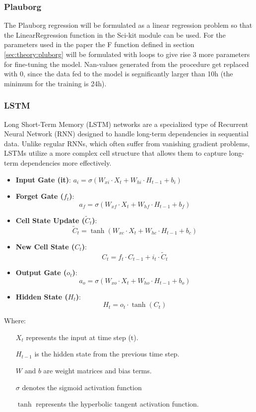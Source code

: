 \subsubsection{Plauborg}

The Plauborg regression will be formulated as a linear regression problem so that the LinearRegression function in the Sci-kit module can be used. For the parameters used in the paper\cite{plauborg_simple_2002} the F function defined in section \ref{sec:theory:pluborg} will be formulated with loops to give rise 3 more parameters for fine-tuning the model. Nan-values generated from the procedure get replaced with 0, since the data fed to the model is segnificantly larger than 10h (the minimum for the training is 24h).

\subsubsection{LSTM}

Long Short-Term Memory (LSTM) networks are a specialized type of Recurrent Neural Network (RNN) designed to handle long-term dependencies in sequential data. Unlike regular RNNs, which often suffer from vanishing gradient problems, LSTMs utilize a more complex cell structure that allows them to capture long-term dependencies more effectively.

\begin{itemize}
	\item \textbf{Input Gate (it​)}:
	$ a_i = \sigma(W_{xi} \cdot X_t + W_{hi} \cdot H_{t-1} + b_i) $
	\item \textbf{Forget Gate ($f_t$)}:
	\[ a_f = \sigma(W_{xf} \cdot X_t + W_{hf} \cdot H_{t-1} + b_f) \]
	
	\item \textbf{Cell State Update ($\tilde{C}_t$)}:
	\[ \tilde{C}_t = \tanh(W_{xc} \cdot X_t + W_{hc} \cdot H_{t-1} + b_c) \]
	
	\item \textbf{New Cell State ($C_t$)}:
	\[ C_t = f_t \cdot C_{t-1} + i_t \cdot \tilde{C}_t \]
	
	\item \textbf{Output Gate ($o_t$)}:
	\[ a_o = \sigma(W_{xo} \cdot X_t + W_{ho} \cdot H_{t-1} + b_o) \]
	
	\item \textbf{Hidden State ($H_t$)}:
	\[ H_t = o_t \cdot \tanh(C_t) \]
	
\end{itemize}
Where:
\begin{itemize}
	\item[\(X_t\)] represents the input at time step (t).
	\item[\(H_{t-1}\)]  is the hidden state from the previous time step.
	\item[\(W\) and \(b\)]  are weight matrices and bias terms.
	\item[\(\sigma\)]  denotes the sigmoid activation function
	\item[\(\tanh\)]  represents the hyperbolic tangent activation function.
\end{itemize}

